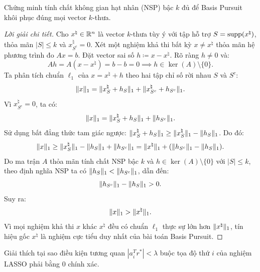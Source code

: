 \begin{exercise}
Chứng minh tính chất không gian hạt nhân (NSP) bậc $k$ đủ để Basis Pursuit khôi phục đúng mọi vector $k$-thưa.
\end{exercise}

\begin{proof}[Lời giải chi tiết]
Cho $x^\natural \in \mathbb{R}^n$ là vector $k$-thưa tùy ý với tập hỗ trợ $S = \operatorname{supp}(x^\natural)$, thỏa mãn $|S| \le k$ và $x^\natural_{S^c} = 0$. Xét một nghiệm khả thi bất kỳ $x \ne x^\natural$ thỏa mãn hệ phương trình đo $Ax = b$. 
Đặt vector sai số $h \coloneqq x - x^\natural$. Rõ ràng $h \ne 0$ và:
\[
Ah = A(x - x^\natural) = b - b = 0 \implies h \in \ker(A) \setminus \{0\}.
\]
Ta phân tích chuẩn $\ell_1$ của $x = x^\natural + h$ theo hai tập chỉ số rời nhau $S$ và $S^c$:
\[
\|x\|_1 = \|x^\natural_S + h_S\|_1 + \|x^\natural_{S^c} + h_{S^c}\|_1.
\]
Vì $x^\natural_{S^c} = 0$, ta có:
\[
\|x\|_1 = \|x^\natural_S + h_S\|_1 + \|h_{S^c}\|_1.
\]
Sử dụng bất đẳng thức tam giác ngược: $\|x^\natural_S + h_S\|_1 \ge \|x^\natural_S\|_1 - \|h_S\|_1$. Do đó:
\[
\|x\|_1 \ge \|x^\natural_S\|_1 - \|h_S\|_1 + \|h_{S^c}\|_1 = \|x^\natural\|_1 + (\|h_{S^c}\|_1 - \|h_S\|_1).
\]
Do ma trận $A$ thỏa mãn tính chất NSP bậc $k$ và $h \in \ker(A) \setminus \{0\}$ với $|S| \le k$, theo định nghĩa NSP ta có $\|h_S\|_1 < \|h_{S^c}\|_1$, dẫn đến:
\[
\|h_{S^c}\|_1 - \|h_S\|_1 > 0.
\]
Suy ra:
\[
\|x\|_1 > \|x^\natural\|_1.
\]
Vì mọi nghiệm khả thi $x$ khác $x^\natural$ đều có chuẩn $\ell_1$ thực sự lớn hơn $\|x^\natural\|_1$, tín hiệu gốc $x^\natural$ là nghiệm cực tiểu duy nhất của bài toán Basis Pursuit.
\end{proof}

\begin{exercise}[Bài 5: Cơ chế triệt tiêu hệ số $|a_i^T r^*| < \lambda \implies x_i^* = 0$ trong LASSO]
Giải thích tại sao điều kiện tương quan $|a_i^T r^*| < \lambda$ buộc tọa độ thứ $i$ của nghiệm LASSO phải bằng 0 chính xác.
\end{exercise}

